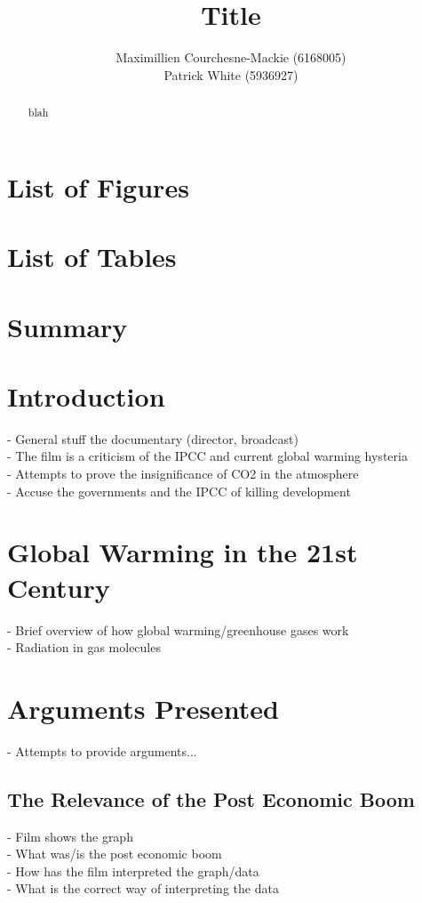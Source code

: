 \documentclass[12pt]{article}
\title{Title}
\author{Maximillien Courchesne-Mackie (6168005) \\
             Patrick White (5936927)}
\date{}
\begin{document}
\maketitle
\newpage

\begin{abstract}
blah
\end{abstract}
\newpage

\tableofcontents
\newpage

\section*{List of Figures}
\section*{List of Tables}
\newpage

\section*{Summary}
\newpage

\section{Introduction}
	- General stuff the documentary (director, broadcast) \\
	- The film is a criticism of the IPCC and current global warming hysteria \\
	- Attempts to prove the insignificance of CO2 in the atmosphere \\
	- Accuse the governments and the IPCC of killing development \\
\section{Global Warming in the 21st Century}
	- Brief overview of how global warming/greenhouse gases work\\
	- Radiation in gas molecules\\
\section{Arguments Presented}
	- Attempts to provide arguments...\\
\subsection{The Relevance of the Post Economic Boom}
	- Film shows the graph\\
	- What was/is the post economic boom\\
	- How has the film interpreted the graph/data\\
	- What is the correct way of interpreting the data\\
\end{document}

